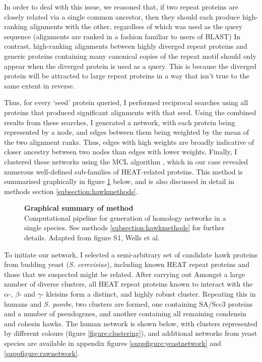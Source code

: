 \documentclass[a4paper,11pt,twoside,openright]{scrbook}
\begin{document}
In order to deal with this issue, we reasoned that, if two repeat proteins are
closely related via a single common ancestor, then they should each produce
high-ranking alignments with the other, regardless of which was used as the
query sequence (alignments are ranked in a fashion familiar to users of BLAST)
In contrast, high-ranking alignments between highly diverged repeat proteins and
generic proteins containing many canonical copies of the repeat motif should
only appear when the diverged protein is used as a query. This is because the
diverged protein will be attracted to large repeat proteins in a way that isn't
true to the same extent in reverse.

Thus, for every `seed' protein queried, I performed reciprocal searches using
all proteins that produced significant alignments with that seed. Using the
combined results from these searches, I generated a network, with each protein
being represented by a node, and edges between them being weighted by the mean
of the two alignment ranks. Thus, edges with high weights are broadly indicative
of closer ancestry between two nodes than edges with lower weights. Finally, I
clustered these networks using the MCL algorithm \cite{VanDongen2000}, which in
our case revealed numerous well-defined sub-families of HEAT-related proteins.
This method is summarised graphically in figure \ref{figure:hawkmethod} below,
and is also discussed in detail in methods section \ref{subsection:hawkmethods}.

\begin{figure}[h]
    \caption[Graphical summary of method]{\sffamily \textbf{Graphical summary of
    method} \\ \small Computational pipeline for generation of homology networks
    in a single species. See methods \ref{subsection:hawkmethods} for further
    details. Adapted from figure S1, Wells et al. \cite{Wells2017}}
\label{figure:hawkmethod} \end{figure}

To initiate our network, I selected a semi-arbitrary set of candidate hawk
proteins from budding yeast (\textit{S. cerevisiae}), including known HEAT
repeat proteins and those that we suspected might be related. After carrying out
Amongst a large number of diverse clusters, all HEAT repeat proteins known to
interact with the $\alpha$-, $\beta$- and $\gamma$- kleisins \cite{Nasmyth2009,
Hirano2016} form a distinct, and highly robust cluster. Repeating this in humans
and \textit{S. pombe}, two clusters are formed, one containing SA/Scc3 proteins
and a number of pseudogenes, and another containing all remaining condensin and
cohesin hawks. The human network is shown below, with clusters represented by
different colours (figure \ref{figure:clustering}), and additional networks from
yeast species are available in appendix figures \ref{suppfigure:yeastnetwork}
and \ref{suppfigure:rawnetwork}.
\end{document}
